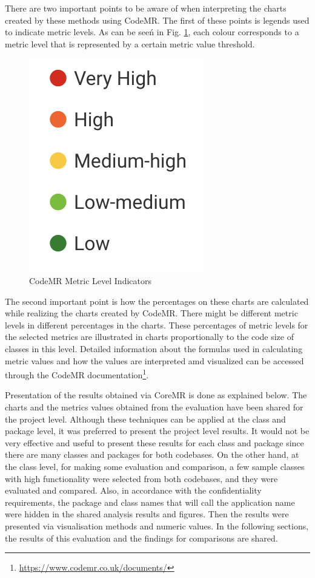 There are two important points to be aware of when interpreting the charts created by these methods using CodeMR. The first of these points is legends used to indicate metric levels. As can be seeń in Fig. \ref{fig:code-mr-legends}, each colour corresponds to a metric level that is represented by a certain metric value threshold. 
\begin{figure}[ht!]
    \centering
    \includegraphics[scale=0.7]{figures/code-mr-legends.png}
    \caption{CodeMR Metric Level Indicators}
    \label{fig:code-mr-legends}
\end{figure}
\FloatBarrier

The second important point is how the percentages on these charts are calculated while realizing the charts created by CodeMR. There might be different metric levels in different percentages in the charts. These percentages of metric levels for the selected metrics are illustrated in charts proportionally to the code size of classes in this level. Detailed information about the formulas used in calculating metric values and how the values are interpreted amd visualized can be accessed through the CodeMR documentation\footnote{\label{fn:codemr} \url{https://www.codemr.co.uk/documents/}}.

Presentation of the results obtained via CoreMR is done as explained below. The charts and the  metrics values obtained from the evaluation have been shared for the project level. Although these techniques can be applied at the class and package level, it was preferred to present the project level results. It would not be very effective and useful to present these results for each class and package since there are many classes and packages for both codebases. On the other hand, at the class level, for making some evaluation and comparison, a few sample classes with high functionality were selected from both codebases, and they were evaluated and compared. Also, in accordance with the confidentiality requirements, the package and class names that will call the application name were hidden in the shared analysis results and figures. Then the results were presented via visualisation methods and numeric values. In the following sections, the results of this evaluation and the findings for comparisons are shared.


